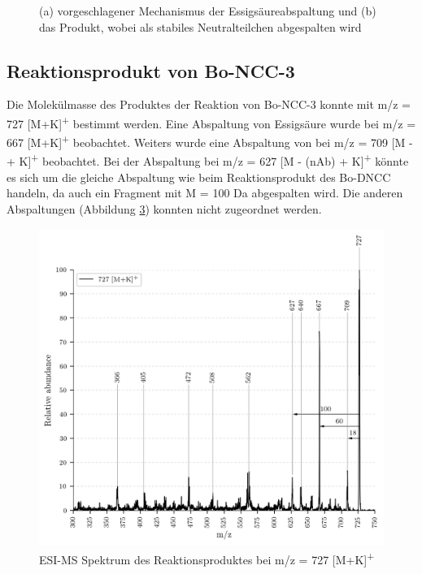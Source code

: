 \begin{figure}[!htbp]
\begin{subfigure}[b]{0.5\textwidth}
    \caption{}
    \label{fig:699MK639}
  \end{subfigure}
  \caption[Vorschlag des Mechanismus der  Abspaltung, Quelle: Autor]{(a) vorgeschlagener Mechanismus der Essigsäureabspaltung und (b) das Produkt, wobei  als stabiles Neutralteilchen abgespalten wird}
\end{figure}



\pagebreak
\subsection{Reaktionsprodukt von Bo-NCC-3}

Die Molekülmasse des Produktes der Reaktion von Bo-NCC-3 konnte mit m/z = 727 [M+K]\textsuperscript{+} bestimmt werden. Eine Abspaltung von Essigsäure wurde bei m/z = 667 [M+K]\textsuperscript{+} beobachtet. Weiters wurde eine Abspaltung von  bei m/z = 709 [M -  + K]\textsuperscript{+} beobachtet. Bei der Abspaltung bei m/z = 627 [M - (\gls{nAb}) + K]\textsuperscript{+} könnte es sich um die gleiche Abspaltung wie beim Reaktionsprodukt des Bo-DNCC handeln, da auch ein Fragment mit M = 100 Da abgespalten wird. Die anderen Abspaltungen (Abbildung \ref{fig:727MKLeafspray}) konnten nicht zugeordnet werden.

\begin{figure}[!htbp]
  \centering
  \includegraphics[width=\textwidth, height=0.7\textwidth]{figures/Kapitel4/Kataboliten/VWA_MS_LeafSpray_727.png}
  \caption[ESI-MS des Reaktionsproduktes von Bo-NCC-3, Quelle: Autor]{ESI-MS Spektrum des Reaktionsproduktes bei m/z = 727 [M+K]\textsuperscript{+}}
  \label{fig:727MKLeafspray}
\end{figure}

